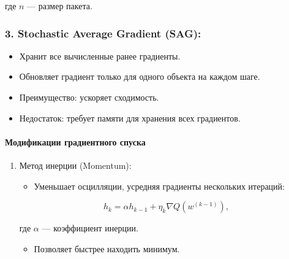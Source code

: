 где \(n\) --- размер пакета.

\hypertarget{stochastic-average-gradient-sag}{%
\subsubsection*{3. Stochastic Average Gradient
(SAG):}\label{stochastic-average-gradient-sag}}

\begin{itemize}
\tightlist
\item
  Хранит все вычисленные ранее градиенты.
\item
  Обновляет градиент только для одного объекта на каждом шаге.
\item
  Преимущество: ускоряет сходимость.
\item
  Недостаток: требует памяти для хранения всех градиентов.
\end{itemize}

\hypertarget{ux43cux43eux434ux438ux444ux438ux43aux430ux446ux438ux438-ux433ux440ux430ux434ux438ux435ux43dux442ux43dux43eux433ux43e-ux441ux43fux443ux441ux43aux430}{%
\paragraph{Модификации градиентного
спуска}\label{ux43cux43eux434ux438ux444ux438ux43aux430ux446ux438ux438-ux433ux440ux430ux434ux438ux435ux43dux442ux43dux43eux433ux43e-ux441ux43fux443ux441ux43aux430}}

\begin{enumerate}
\def\labelenumi{\arabic{enumi}.}
\tightlist
\item
  Метод инерции (Momentum):

  \begin{itemize}
  \tightlist
  \item
    Уменьшает осцилляции, усредняя градиенты нескольких итераций:
  \end{itemize}


\begin{equation}
h_k = \alpha h_{k-1} + \eta_k \nabla Q(w^{(k-1)}),
\end{equation}

где \(\alpha\) --- коэффициент инерции. 

\begin{itemize}
  \tightlist
  \item
Позволяет быстрее находить минимум.
\end{itemize}
\end{enumerate}

